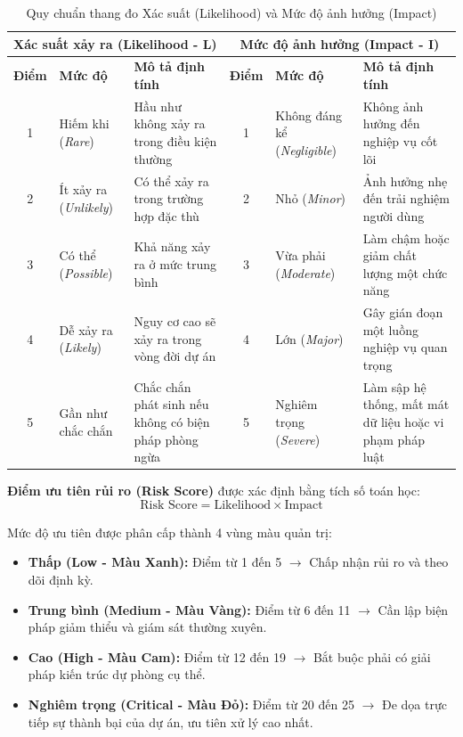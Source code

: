 \begin{table}[htbp]
\centering
\small
\caption{Quy chuẩn thang đo Xác suất (Likelihood) và Mức độ ảnh hưởng (Impact)}
\label{tab:risk-scales}
\begin{tabularx}{\textwidth}{c l p{5.5cm} c l p{5.5cm}}
\toprule
\multicolumn{3}{c}{\textbf{Xác suất xảy ra (Likelihood - L)}} & \multicolumn{3}{c}{\textbf{Mức độ ảnh hưởng (Impact - I)}} \\
\midrule
\textbf{Điểm} & \textbf{Mức độ} & \textbf{Mô tả định tính} & \textbf{Điểm} & \textbf{Mức độ} & \textbf{Mô tả định tính} \\
\midrule
1 & Hiếm khi (\textit{Rare}) & Hầu như không xảy ra trong điều kiện thường & 1 & Không đáng kể (\textit{Negligible}) & Không ảnh hưởng đến nghiệp vụ cốt lõi \\
2 & Ít xảy ra (\textit{Unlikely}) & Có thể xảy ra trong trường hợp đặc thù & 2 & Nhỏ (\textit{Minor}) & Ảnh hưởng nhẹ đến trải nghiệm người dùng \\
3 & Có thể (\textit{Possible}) & Khả năng xảy ra ở mức trung bình & 3 & Vừa phải (\textit{Moderate}) & Làm chậm hoặc giảm chất lượng một chức năng \\
4 & Dễ xảy ra (\textit{Likely}) & Nguy cơ cao sẽ xảy ra trong vòng đời dự án & 4 & Lớn (\textit{Major}) & Gây gián đoạn một luồng nghiệp vụ quan trọng \\
5 & Gần như chắc chắn & Chắc chắn phát sinh nếu không có biện pháp phòng ngừa & 5 & Nghiêm trọng (\textit{Severe}) & Làm sập hệ thống, mất mát dữ liệu hoặc vi phạm pháp luật \\
\bottomrule
\end{tabularx}
\end{table}

\textbf{Điểm ưu tiên rủi ro (Risk Score)} được xác định bằng tích số toán học:
\begin{equation}
\text{Risk Score} = \text{Likelihood} \times \text{Impact}
\end{equation}

Mức độ ưu tiên được phân cấp thành 4 vùng màu quản trị:
\begin{itemize}
    \item \textbf{Thấp (Low - Màu Xanh):} Điểm từ 1 đến 5 $\rightarrow$ Chấp nhận rủi ro và theo dõi định kỳ.
    \item \textbf{Trung bình (Medium - Màu Vàng):} Điểm từ 6 đến 11 $\rightarrow$ Cần lập biện pháp giảm thiểu và giám sát thường xuyên.
    \item \textbf{Cao (High - Màu Cam):} Điểm từ 12 đến 19 $\rightarrow$ Bắt buộc phải có giải pháp kiến trúc dự phòng cụ thể.
    \item \textbf{Nghiêm trọng (Critical - Màu Đỏ):} Điểm từ 20 đến 25 $\rightarrow$ Đe dọa trực tiếp sự thành bại của dự án, ưu tiên xử lý cao nhất.
\end{itemize}

